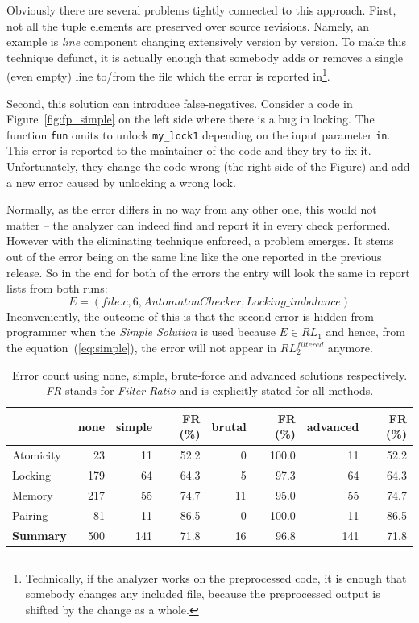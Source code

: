 \documentclass{acm_proc_article-sp}
\begin{document}
Obviously there are several problems tightly connected to this approach.
First, not all the tuple elements are preserved over source revisions. Namely,
an example is \textit{line} component changing extensively version by version.
To make this technique defunct, it is actually enough that somebody adds or
removes a single (even empty) line to/from the file which the error is
reported in\footnote{Technically, if the analyzer works on the preprocessed
code, it is enough that somebody changes any included file, because the
preprocessed output is shifted by the change as a whole.}.

Second, this solution can introduce false-negatives. Consider a code in
Figure~\ref{fig:fp_simple} on the left side where there is a bug in locking.
The function \texttt{fun} omits to unlock \texttt{my\_lock1} depending on the
input parameter \texttt{in}. This error is reported to the maintainer of the
code and they try to fix it. Unfortunately, they change the code wrong (the
right side of the Figure) and add a new error caused by unlocking a wrong
lock.

Normally, as the error differs in no way from any other one, this would not
matter -- the analyzer can indeed find and report it in every check performed.
However with the eliminating technique enforced, a problem emerges. It stems
out of the error being on the same line like the one reported in the previous
release. So in the end for both of the errors the entry will look the same in
report lists from both runs:
\begin{displaymath}
E=(file.c, 6, AutomatonChecker, Locking\_imbalance)
\end{displaymath}
Inconveniently, the outcome of this is that the second error is hidden from
programmer when the \emph{Simple Solution} is used because $E \in RL_1$ and
hence, from the equation~(\ref{eq:simple}), the error will not appear in
$RL^{filtered}_2$ anymore.

\begin{table}[tb]
\begin{center}
\begin{tabular}{|l|r||r|r||r|r||r|r|} \hline
          & \textbf{none} & \textbf{simple} & \textbf{FR} (\%) &
	  \textbf{brutal} & \textbf{FR} (\%) & \textbf{advanced} &
	  \textbf{FR} (\%) \\ \hline
Atomicity        & 23  & 11  & 52.2 & 0  & 100.0 & 11  & 52.2 \\ \hline
Locking          & 179 & 64  & 64.3 & 5  & 97.3  & 64  & 64.3 \\ \hline
Memory           & 217 & 55  & 74.7 & 11 & 95.0  & 55  & 74.7 \\ \hline
Pairing          & 81  & 11  & 86.5 & 0  & 100.0 & 11  & 86.5 \\ \hline
\textbf{Summary} & 500 & 141 & 71.8 & 16 & 96.8  & 141 & 71.8 \\ \hline
\end{tabular}
\end{center}
\caption{Error count using none, simple, brute-force and advanced solutions
respectively. \emph{FR} stands for \emph{Filter Ratio} and is explicitly
stated for all methods.}
\label{tab:res}
\end{table}
\end{document}
